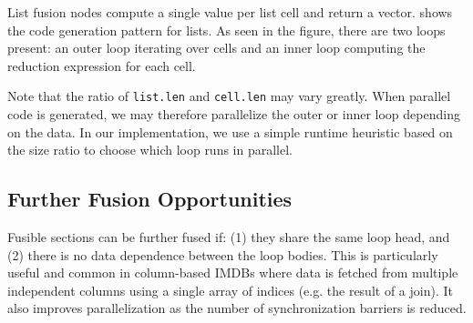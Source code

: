 List fusion nodes compute a single value per list cell and return a vector.  shows the code generation pattern for lists. As seen in
the figure, there are two loops present: an outer loop iterating over cells and an
inner loop computing the reduction expression for each cell.


Note that the ratio of \texttt{list.len} and \texttt{cell.len} may vary greatly.
When parallel code is generated, we may therefore parallelize the outer or inner loop
depending on the data. In our implementation, we use a simple runtime heuristic based
on the size ratio to choose which loop runs in parallel.

\subsection{Further Fusion Opportunities}

Fusible sections can be further fused if:
(1) they share the same loop head, and
(2) there is no data dependence between the loop bodies.
This is particularly useful and common in column-based IMDBs where data is fetched
from multiple independent columns using a single array of indices (e.g. the result
of a join). It also improves parallelization as the number of synchronization barriers
is reduced.

